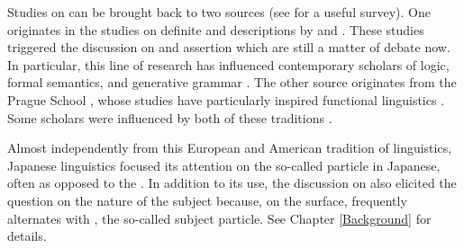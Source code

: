 Studies on  can be brought back to two sources
(see  for a useful survey). %
One originates in the studies on definite and  descriptions by  and . These studies triggered the discussion on  and assertion which are still a matter of debate now. 
In particular, this line of research has influenced contemporary scholars of logic, formal semantics, and generative grammar \cite{chomsky65,jackendoff72,selkirk84,rooth85,rizzi97,erteschik-shir97,erteschik-shir07,buring07,ishihara11,krifkamusan12,endo14}.
The other source originates from the Prague School \cite{mathesius28,mathesius29,sgall67,firbas75}, whose studies have particularly inspired functional linguistics
\cite{bolinger65,halliday67,kuno73,gundel74,chafe76,chafe94,prince81,givon83,tomlin86,lambrecht94,birnerward98,birnerward09}.
Some scholars were influenced by both of these traditions
\cite{vallduvi90,steedman91,vallduvivilkuna98}. 

Almost independently from this European and American tradition of linguistics, Japanese linguistics focused its attention on the so-called  particle  in Japanese, often as opposed to the   \cite{matsushita28,yamada36,tokieda50,mikami53,mikami60,onoe81,kinsui95,kikuchi95,noda96,masuoka00,masuoka12}.
In addition to its use, the discussion on  also elicited the question on the nature of the subject
because, on the surface,  frequently alternates with ,
the so-called subject particle.
See Chapter \ref{Background} for details.

